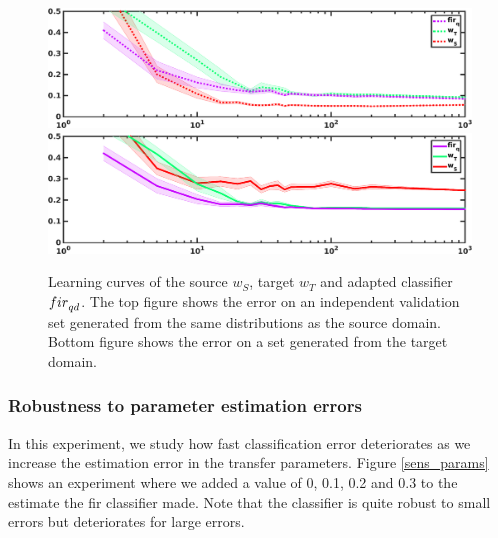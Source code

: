 \documentclass[twoside,11pt]{article}
\begin{document}
\begin{figure}[ht]
\centering
\includegraphics[width=.9\textwidth]{images/learning_curveS.eps} \vspace{5px} \\
\includegraphics[width=.9\textwidth]{images/learning_curveT.eps}
\caption{Learning curves of the source $w_{S}$, target $w_{T}$ and adapted classifier ${\sc fir}_{qd}$. The top figure shows the error on an independent validation set generated from the same distributions as the source domain. Bottom figure shows the error on a set generated from the target domain.}
\label{lc}
\end{figure}

\subsubsection{Robustness to parameter estimation errors}
In this experiment, we study how fast classification error deteriorates as we increase the estimation error in the transfer parameters. Figure \ref{sens_params} shows an experiment where we added a value of 0, 0.1, 0.2 and 0.3 to the estimate the {\sc fir} classifier made. Note that the classifier is quite robust to small errors but deteriorates for large errors.
\end{document}
